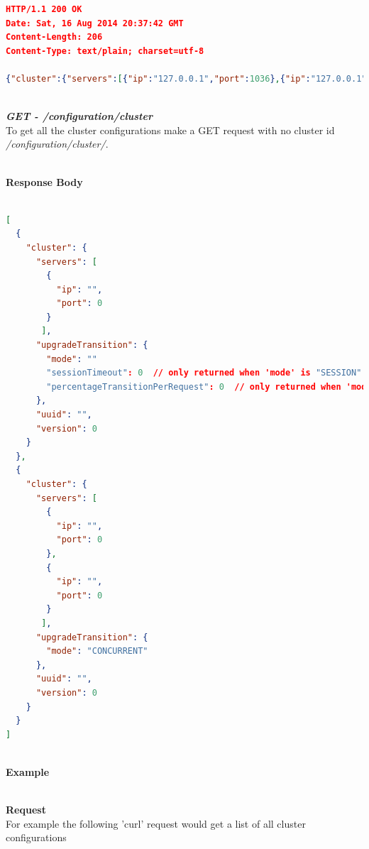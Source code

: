 \documentclass[a4paper,11pt,twoside]{article}
\begin{document}
\begin{lstlisting}[language=json,firstnumber=1]
HTTP/1.1 200 OK
Date: Sat, 16 Aug 2014 20:37:42 GMT
Content-Length: 206
Content-Type: text/plain; charset=utf-8

{"cluster":{"servers":[{"ip":"127.0.0.1","port":1036},{"ip":"127.0.0.1","port":1038}],"upgradeTransition":{"mode":"SESSION","sessionTimeout":60},"uuid":"016ca2cd-2585-11e4-ab5c-600308a8245e","version":1.1}}
\end{lstlisting}

\noindent \\
\textit{\textbf{GET - /configuration/cluster}}\\
\noindent 
To get all the cluster configurations make a GET request with no cluster id \textit{/configuration/cluster/}.

\noindent \\
\textbf{Response Body}\\

\begin{lstlisting}[language=json,firstnumber=1]

[
  {
    "cluster": {
      "servers": [
        {
          "ip": "",
          "port": 0
        }
       ],
      "upgradeTransition": {
        "mode": ""
        "sessionTimeout": 0  // only returned when 'mode' is "SESSION" 
        "percentageTransitionPerRequest": 0  // only returned when 'mode' is "GRADUAL"
      },
      "uuid": "",
      "version": 0
    }
  },
  {
    "cluster": {
      "servers": [
        {
          "ip": "",
          "port": 0
        },
        {
          "ip": "",
          "port": 0
        }
       ],
      "upgradeTransition": {
        "mode": "CONCURRENT"
      },
      "uuid": "",
      "version": 0
    }
  }
]
\end{lstlisting}

\noindent \\
\textbf{Example}

\noindent \\
\textbf{Request}\\

\noindent 
For example the following 'curl' request would get a list of all cluster configurations\\
\end{document}
